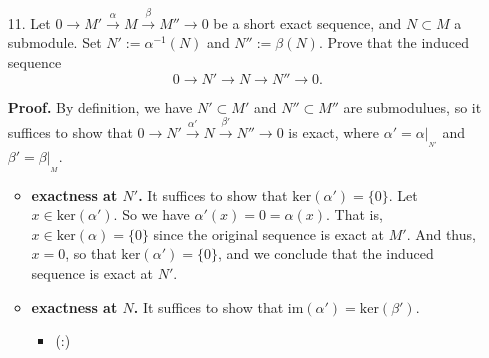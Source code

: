 \documentclass[9pt]{article}
\begin{document}
\begin{enumerate}
   \item[11.]  Let $0 \rightarrow M' \stackrel{\alpha}{\longrightarrow} M
               \stackrel{\beta}{\longrightarrow} M'' \rightarrow 0$ be a
               short exact sequence, and $N \subset M$ a submodule. Set
               $N' := \alpha^{-1}(N)$ and $N'' := \beta(N)$. Prove that the
               induced sequence
               $$0 \rightarrow N' \rightarrow N \rightarrow N'' \rightarrow 0.$$

      \textbf{Proof.} By definition, we have $N' \subset M'$ and
      $N'' \subset M''$ are submodulues, so it suffices to show that
      $0 \rightarrow N' \stackrel{\alpha'}{\longrightarrow} N
      \stackrel{\beta'}{\longrightarrow}N'' \rightarrow 0$ is exact, where
      $\alpha' = \alpha|_{_{N'}}$ and $\beta' = \beta|_{_{M}}$.

      \begin{itemize}
         \item \textbf{exactness at $N'$.} It suffices to show that
               $\text{ker}(\alpha') = \{0\}$. Let $x \in \text{ker}(\alpha')$.
               So we have $\alpha'(x) = 0 = \alpha(x)$. That is,
               $x \in \text{ker}(\alpha) = \{0\}$ since the original sequence is
               exact at $M'$. And thus, $x = 0$, so that
               $\text{ker}(\alpha') = \{0\}$, and we conclude that the induced
               sequence is exact at $N'$.
         \item \textbf{exactness at $N$.} It suffices to show that
               $\text{im}(\alpha') = \text{ker}(\beta')$.
               \begin{itemize}
                  \item (\subseteq:)
               \end{itemize}
      \end{itemize}
                
\end{enumerate}
\end{document}
